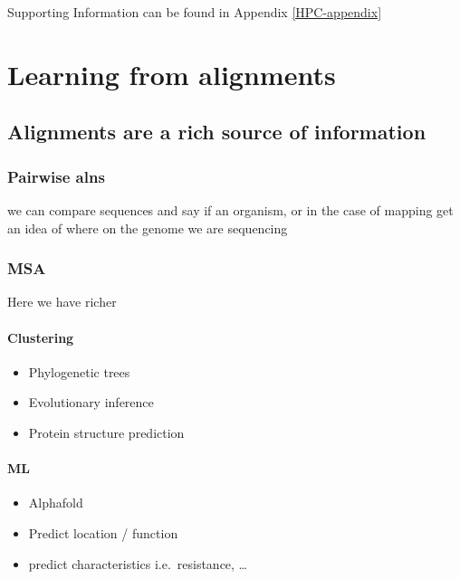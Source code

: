 \documentclass[
  11pt,
  twoside]{scrbook}
\providecommand{\tightlist}{%
  \setlength{\itemsep}{0pt}\setlength{\parskip}{0pt}}
\begin{document}
Supporting Information can be found in Appendix \ref{HPC-appendix}

\printbibliography[segment=\therefsegment,heading=subbibintoc,title={References for chapter \thechapter}]

\hypertarget{learning-from-alignments}{%
\chapter{Learning from alignments}\label{learning-from-alignments}}

\hypertarget{alignments-are-a-rich-source-of-information}{%
\section{Alignments are a rich source of information}\label{alignments-are-a-rich-source-of-information}}

\hypertarget{pairwise-alns}{%
\subsection{Pairwise alns}\label{pairwise-alns}}

we can compare sequences and say if an organism, or in the case of mapping get an idea of where on the genome we are sequencing

\hypertarget{msa}{%
\subsection{MSA}\label{msa}}

Here we have richer

\hypertarget{clustering}{%
\subsubsection{Clustering}\label{clustering}}

\begin{itemize}
\item
  Phylogenetic trees
\item
  Evolutionary inference
\item
  Protein structure prediction
\end{itemize}

\hypertarget{ml}{%
\subsubsection{ML}\label{ml}}

\begin{itemize}
\tightlist
\item
  Alphafold
\item
  Predict location / function
\item
  predict characteristics i.e.~resistance, \ldots{}
\end{itemize}
\end{document}
